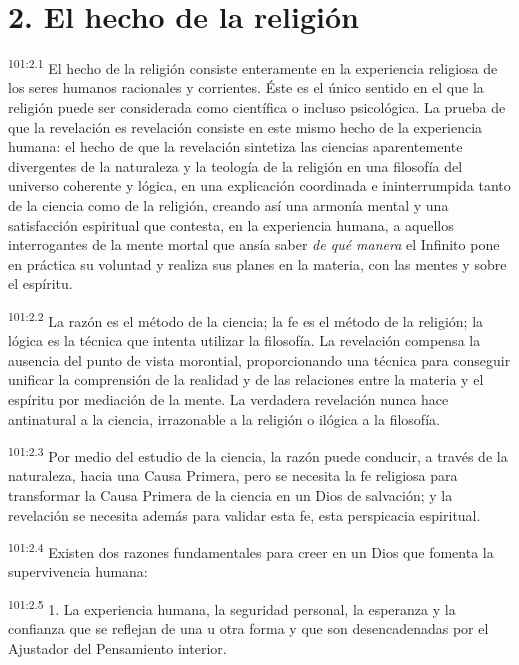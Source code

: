 \section*{2. El hecho de la religión}
\par
\textsuperscript{101:2.1} El hecho de la religión consiste enteramente en la experiencia religiosa de los seres humanos racionales y corrientes. Éste es el único sentido en el que la religión puede ser considerada como científica o incluso psicológica. La prueba de que la revelación es revelación consiste en este mismo hecho de la experiencia humana: el hecho de que la revelación sintetiza las ciencias aparentemente divergentes de la naturaleza y la teología de la religión en una filosofía del universo coherente y lógica, en una explicación coordinada e ininterrumpida tanto de la ciencia como de la religión, creando así una armonía mental y una satisfacción espiritual que contesta, en la experiencia humana, a aquellos interrogantes de la mente mortal que ansía saber \textit{de qué manera} el Infinito pone en práctica su voluntad y realiza sus planes en la materia, con las mentes y sobre el espíritu.

\par
\textsuperscript{101:2.2} La razón es el método de la ciencia; la fe es el método de la religión; la lógica es la técnica que intenta utilizar la filosofía. La revelación compensa la ausencia del punto de vista morontial, proporcionando una técnica para conseguir unificar la comprensión de la realidad y de las relaciones entre la materia y el espíritu por mediación de la mente. La verdadera revelación nunca hace antinatural a la ciencia, irrazonable a la religión o ilógica a la filosofía.

\par
\textsuperscript{101:2.3} Por medio del estudio de la ciencia, la razón puede conducir, a través de la naturaleza, hacia una Causa Primera, pero se necesita la fe religiosa para transformar la Causa Primera de la ciencia en un Dios de salvación; y la revelación se necesita además para validar esta fe, esta perspicacia espiritual.

\par
\textsuperscript{101:2.4} Existen dos razones fundamentales para creer en un Dios que fomenta la supervivencia humana:

\par
\textsuperscript{101:2.5} 1. La experiencia humana, la seguridad personal, la esperanza y la confianza que se reflejan de una u otra forma y que son desencadenadas por el Ajustador del Pensamiento interior.

